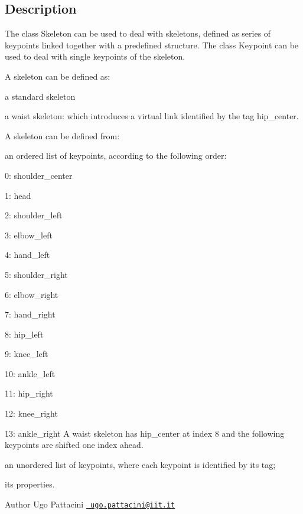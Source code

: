 \hypertarget{group__skeletonViewer_intro_sec}{}\subsection{Description}\label{group__skeletonViewer_intro_sec}
The class Skeleton can be used to deal with skeletons, defined as series of keypoints linked together with a predefined structure. The class Keypoint can be used to deal with single keypoints of the skeleton.

A skeleton can be defined as\+:
\begin{DoxyItemize}
\item a standard skeleton
\item a waist skeleton\+: which introduces a virtual link identified by the tag hip\+\_\+center.
\end{DoxyItemize}

A skeleton can be defined from\+:
\begin{DoxyItemize}
\item an ordered list of keypoints, according to the following order\+:
\begin{DoxyItemize}
\item 0\+: shoulder\+\_\+center
\item 1\+: head
\item 2\+: shoulder\+\_\+left
\item 3\+: elbow\+\_\+left
\item 4\+: hand\+\_\+left
\item 5\+: shoulder\+\_\+right
\item 6\+: elbow\+\_\+right
\item 7\+: hand\+\_\+right
\item 8\+: hip\+\_\+left
\item 9\+: knee\+\_\+left
\item 10\+: ankle\+\_\+left
\item 11\+: hip\+\_\+right
\item 12\+: knee\+\_\+right
\item 13\+: ankle\+\_\+right A waist skeleton has hip\+\_\+center at index 8 and the following keypoints are shifted one index ahead.
\end{DoxyItemize}
\item an unordered list of keypoints, where each keypoint is identified by its tag;
\item its properties.
\end{DoxyItemize}

\begin{DoxyAuthor}{Author}
Ugo Pattacini \href{mailto:ugo.pattacini@iit.it}{\texttt{ ugo.\+pattacini@iit.\+it}} 
\end{DoxyAuthor}



